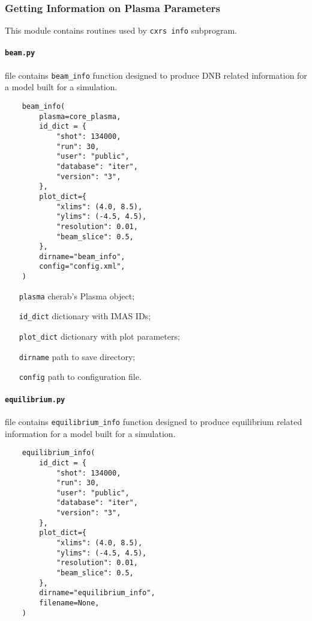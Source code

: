 \documentclass[../../main.tex]{subfiles}
\begin{document}
\subsubsection{Getting Information on Plasma Parameters}%
\label{sec:info}

This module contains routines used by \texttt{cxrs info} subprogram.


\paragraph{\texttt{beam.py}} file contains \texttt{beam\_info} function designed to produce DNB related information for a model built for a simulation.

\begin{verbatim}
    beam_info(
        plasma=core_plasma,
        id_dict = {
            "shot": 134000,
            "run": 30,
            "user": "public",
            "database": "iter",
            "version": "3",
        },
        plot_dict={
            "xlims": (4.0, 8.5),
            "ylims": (-4.5, 4.5),
            "resolution": 0.01,
            "beam_slice": 0.5,
        },
        dirname="beam_info",
        config="config.xml",
    )
\end{verbatim}

\begin{itemize}[align=left]
    \item[\texttt{plasma}] cherab's Plasma object;
    \item[\texttt{id\_dict}] dictionary with IMAS IDs;
    \item[\texttt{plot\_dict}] dictionary with plot parameters;
    \item[\texttt{dirname}] path to save directory;
    \item[\texttt{config}] path to configuration file.
\end{itemize}

\paragraph{\texttt{equilibrium.py}} file contains \texttt{equilibrium\_info} function designed to produce equilibrium related information for a model built for a simulation.

\begin{verbatim}
    equilibrium_info(
        id_dict = {
            "shot": 134000,
            "run": 30,
            "user": "public",
            "database": "iter",
            "version": "3",
        },
        plot_dict={
            "xlims": (4.0, 8.5),
            "ylims": (-4.5, 4.5),
            "resolution": 0.01,
            "beam_slice": 0.5,
        },
        dirname="equilibrium_info",
        filename=None,
    )
\end{verbatim}
\end{document}
